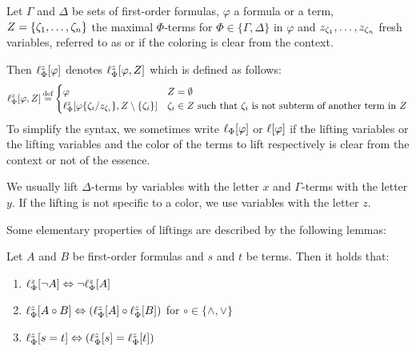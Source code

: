 \begin{defi}[Lifting]
	Let $\Gamma$ and $\Delta$ be sets of first-order formulas, 
	$\varphi$ a formula or a term, $Z=\{\colterm{1}, \dotsc, \colterm{n}\}$ the maximal $\Phi$-terms for $\Phi \in \{\Gamma, \Delta\}$ in $\varphi$ and $z_{\colterm{1}}, \ldots, z_{\colterm{n}}$ fresh variables, referred to as  or  if the coloring is clear from the context.

	Then $\lft{\Phi}{z}{\varphi}$ denotes %
	$\lft{\Phi}{z}{\varphi, Z}$ which is defined as follows:
\[\lft{\Phi}{z}{\varphi, Z} \defeq \begin{cases} \varphi & Z = \emptyset \\ \lft{\Phi}{z}{\varphi\abstractionOp{\colterm{i}/z_{\colterm{i}}}, Z\setminus\{\colterm{i}\}} & \text{$\colterm{i} \in Z$ such that $\colterm{i}$ is not subterm of another term in $Z$} \end{cases}\]
	To simplify the syntax, we sometimes write $\lifphinovar{\varphi}$ or $\lifboth{\varphi}$ if the lifting variables or the lifting variables and the color of the terms to lift respectively is clear from the context or not of the essence.
\end{defi}

We usually lift $\Delta$-terms by variables with the letter $x$ and $\Gamma$-terms with the letter $y$. If the lifting is not specific to a color, we use variables with the letter $z$.


Some elementary properties of liftings are described by the following lemmas:

 
\begin{lemma}
  \label{lemma:lift_commute}
  Let $A$ and $B$ be first-order formulas and $s$ and $t$ be terms. Then it holds that:
  \begin{enumerate}
    \item $\lift{\Phi}{\lnot A}{z} \spas\semiff{} \lnot \lift{\Phi}{A}{z}$
    \item $\lift{\Phi}{A \circ B}{z} \spas\semiff{} ( \lift{\Phi}{A}{z} \circ \lift{\Phi}{B}{z} )$ for  $\circ \in \{\land, \lor\}$
		\item $\lift{\Phi}{s = t}{z} \spas\semiff{} ( \lift{\Phi}{s}{z} = \lift{\Phi}{t}{z} )$
	\end{enumerate}
\end{lemma}

